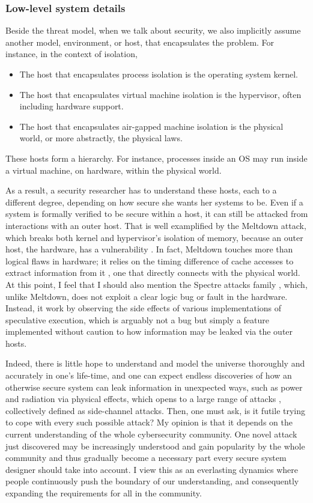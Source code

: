 \documentclass[10pt]{article}
\begin{document}
\subsubsection{Low-level system details} \label{sec.low.level}
Beside the threat model, when we talk about security, we also implicitly assume
another model, environment, or host, that encapsulates the problem. For
instance, in the context of isolation, 
\begin{itemize}
	\item The host that encapsulates process isolation is the operating system
		kernel.
	\item The host that encapsulates virtual machine isolation is the
		hypervisor, often including hardware support.
	\item The host that encapsulates air-gapped machine isolation is the
		physical world, or more abstractly, the physical laws.
\end{itemize} 
These hosts form a hierarchy. For instance, processes inside an OS may run
inside a virtual machine, on hardware, within the physical world.

As a result, a security researcher has to understand these hosts, each to a
different degree, depending on how secure she wants her systems to be. Even if
a system is formally verified to be secure within a host, it can still be
attacked from interactions with an outer host. That is well examplified by
the Meltdown attack, which breaks both kernel and hypervisor's isolation of
memory, because an outer host, the hardware, has a vulnerability
\cite{meltdown}. In fact, Meltdown touches more than logical flaws in hardware;
it relies on the timing difference of cache accesses to extract information
from it \cite{flush.reload}, one that directly connects with the physical
world. At this point, I feel that I should also mention the Spectre attacks
family \cite{spectre}, which, unlike Meltdown, does not exploit a clear logic
bug or fault in the hardware. Instead, it work by observing the side effects
of various implementations of speculative execution, which is arguably not a
bug but simply a feature implemented without caution to how information may be
leaked via the outer hosts.

Indeed, there is little hope to understand and model the universe thoroughly
and accurately in one's life-time, and one can expect endless discoveries of
how an otherwise secure system can leak information in unexpected ways, such as
power and radiation via physical effects, which opens to a large range of
attacks \cite{side.channel.1, side.channel.2, side.channel.3, flush.reload},
collectively defined as side-channel attacks.  Then, one must ask, is it futile
trying to cope with every such possible attack? My opinion is that it depends
on the current understanding of the whole cybersecurity community. One novel
attack just discovered may be increasingly understood and gain popularity by
the whole community and thus gradually become a necessary part every secure
system designer should take into account. I view this as an everlasting
dynamics where people continuously push the boundary of our understanding, and
consequently expanding the requirements for all in the community.
\end{document}
